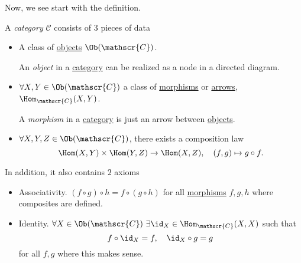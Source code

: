 Now, we see start with the definition.
\begin{definition}[Category]\label{def:category}
	A \emph{category} \(\mathscr{C} \) consists of \(3\) pieces of data
	\begin{itemize}
		\item A class of \hyperref[def:object]{objects} \(\Ob(\mathscr{C})\).
		      \begin{definition}[Object]\label{def:object}
			      An \emph{object} in a \hyperref[def:category]{category} can be realized as a node in a directed diagram.
		      \end{definition}
		\item \(\forall X, Y\in\Ob (\mathscr{C})\) a class of \hyperref[def:morphism]{morphisms} or \underline{arrows}, \(\Hom_{\mathscr{C}}(X, Y)\).
		      \begin{definition}[Morphism]\label{def:morphism}
			      A \emph{morphism} in a \hyperref[def:category]{category} is just an arrow between \hyperref[def:object]{objects}.
		      \end{definition}
		\item \(\forall X, Y, Z\in \Ob (\mathscr{C})\), there exists a composition law
		      \[
			      \Hom (X, Y)\times \Hom (Y, Z)\to \Hom (X, Z),\quad (f, g)\mapsto g\circ f.
		      \]
	\end{itemize}
	In addition, it also contains \(2\) axioms
	\begin{itemize}
		\item Associativity. \((f\circ g)\circ h = f\circ (g\circ h)\) for all \hyperref[def:morphism]{morphisms} \(f, g, h\) where composites are defined.
		\item Identity. \(\forall X\in\Ob (\mathscr{C})\ \exists \id_{X}\in\Hom _{\mathscr{C}} (X, X)\) such that
		      \[
			      f\circ \id_{X} = f,\quad \id_{X} \circ g = g
		      \]
		      for all \(f, g\) where this makes sense.
	\end{itemize}
\end{definition}

